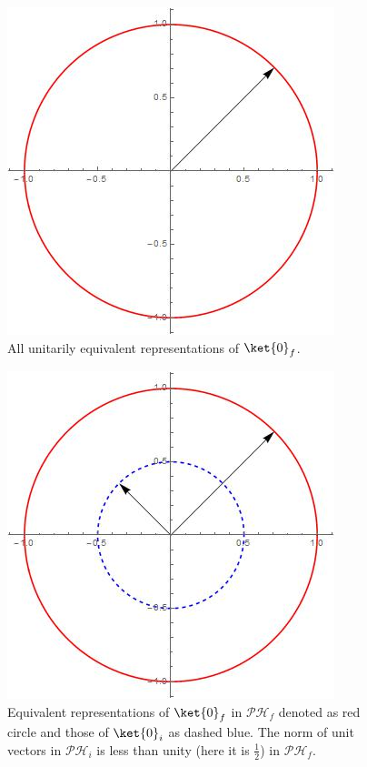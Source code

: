 \documentclass[12pt,a4paper]{article}
\begin{document}
\begin{figure}
  \includegraphics[width=\linewidth]{Hilbert2.jpg}
  \caption{All unitarily equivalent representations of $\ket{0}_f$. }
  \label{H2}
\end{figure}

\begin{figure}
  \includegraphics[width=\linewidth]{Hilbert3.jpg}
  \caption{Equivalent representations of $\ket{0}_f$ in $\mathcal{PH}_f$ denoted as red circle and those of $\ket{0}_i$ as dashed blue. The norm of unit vectors in  $\mathcal{PH}_i$ is less than unity (here it is $\frac{1}{2}$) in  $\mathcal{PH}_f$. }
  \label{H3}
\end{figure}
\end{document}
